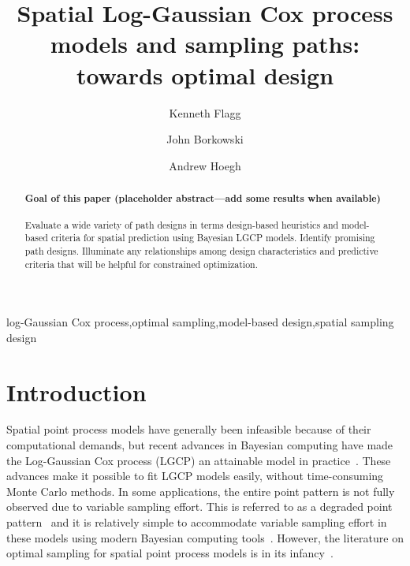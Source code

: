 \documentclass[review]{elsarticle}
\begin{document}
\begin{frontmatter}

\title{Spatial Log-Gaussian Cox process models and sampling paths: towards optimal design}

\author[msuaddr]{Kenneth Flagg}

\author[msuaddr]{John Borkowski}
\author[msuaddr]{Andrew Hoegh}

\address[msuaddr]{Department of Mathematical Sciences, Montana State University, Bozeman, MT 59717}

\begin{abstract}

\paragraph{Goal of this paper (placeholder abstract---add some results when
available)} Evaluate a wide variety of path designs in terms design-based
heuristics and model-based criteria for spatial prediction using Bayesian LGCP
models. Identify promising path designs. Illuminate any relationships among
design characteristics and predictive criteria that will be helpful for
constrained optimization.

\end{abstract}

\begin{keyword}
log-Gaussian Cox process\sep optimal sampling\sep model-based design\sep spatial sampling design
\end{keyword}

\end{frontmatter}

\linenumbers



\section{Introduction}

Spatial point process models have generally been infeasible because of their
computational demands, but recent advances in Bayesian computing have made the
Log-Gaussian Cox process (LGCP) an attainable model in
practice~\citep{rueetal, lindgrenetal, illianetal, simpsonetal}. These advances
make it possible to fit LGCP models easily, without time-consuming Monte Carlo
methods. In some applications, the entire point pattern is not fully observed
due to variable sampling effort. This is referred to as a degraded point
pattern~\citep{chakrabortyetal} and it is relatively simple to accommodate
variable sampling effort in these models using modern Bayesian computing
tools~\citep{yuanetal}. However, the literature on optimal sampling for spatial
point process models is in its infancy~\citep{liuvanhatalo}.
\end{document}
